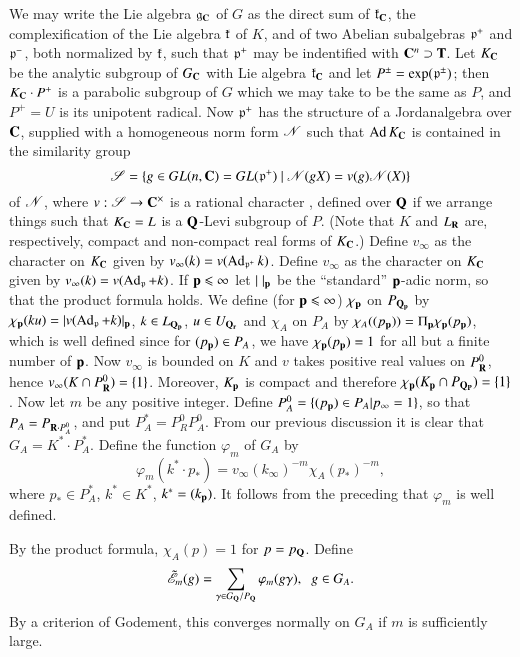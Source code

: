 We may write the Lie algebra $\mathfrak{g}_{\mathbf{C}}$ of $G$ as the direct sum of $\mathfrak{k}_{\mathbf{C}}$, the complexification of the Lie algebra $\mathfrak{k}$ of $K$, and of two Abelian subalgebras $\mathfrak{p}^+$ and $\mathfrak{p}^-$, both normalized by $\mathfrak{k}$, such that $\mathfrak{p}^+$ may be indentified with $\mathbf{C}^n \supset \mathbf{T}$. Let $K_{\mathbf{C}}$ be the analytic subgroup of $G_{\mathbf{C}}$ with Lie algebra $\mathfrak{k}_{\mathbf{C}}$ and let $P^{\pm} = \exp (\mathfrak{p}^{\pm})$; then $K_{\mathbf{C}} \cdot P^+$ is a parabolic subgroup of $G$ which we may take to be the same as $P$, and $P^+ = U$ is its unipotent radical. Now $\mathfrak{p}^+$ has the structure of a Jordan\pageoriginale algebra over $\mathbf{C}$, supplied with a homogeneous norm form $\mathscr{N}$ such that $\operatorname{Ad} K_{\mathbf{C}}$ is contained in the similarity group
$$
\mathscr{S}= \{g \in G L (n, \mathbf{C}) = G L (\mathfrak{p}^+) ~|~ \mathscr{N} (gX) = v (g) \mathscr{N} (X) \}
$$
of $\mathscr{N}$, where $v: \mathscr{S} \to \mathbf{C}^{\times}$ is a rational character \cite{art1-key7}, defined over $\mathbf{Q}$ if we arrange things such that $K_{\mathbf{C}} = L$ is a $\mathbf{Q}$-Levi subgroup of $P$. (Note that $K$ and $L_{\mathbf{R}}$ are, respectively, compact and non-compact real forms of $K_{\mathbf{C}}$.) Define $v_{\infty}$ as the character on $K_{\mathbf{C}}$ given by $v_{\infty} (k) = v (\operatorname{Ad}_{\mathfrak{p}^+} k)$. Define $v_{\infty}$ as the character on $K_{\mathbf{C}}$ given by $v_{\infty}(k)=v(\operatorname{Ad}_{\mathfrak{p}}+k)$. If $\mathbf{p} \leqslant \infty$ let $|{\;}|_{\mathbf{p}}$ be the ``standard'' $\mathbf{p}$-adic norm, so that the product formula holds. We define (for $\mathbf{p} \leqslant \infty$) $\chi_{\mathbf{p}}$ on $P_{\mathbf{Q}_{\mathbf{p}}}$ by $\chi_{\mathbf{p}}(ku)=|v(\operatorname{Ad}_{\mathfrak{p}}+k)|_{\mathbf{p}}$, $k \in L_{\mathbf{Q}_{\mathbf{p}}}$, $u \in U_{\mathbf{Q}_{\mathbf{r}}}$ and $\chi_A$ on $P_A$ by $\chi_A ((p_{\mathbf{p}}))=\Pi_{\mathbf{p}} \chi_{\mathbf{p}} (p_{\mathbf{p}})$, which is well defined since for $(p_{\mathbf{p}}) \in P_A$, we have $\chi_{\mathbf{p}}(p_{\mathbf{p}}) = 1$ for all but a finite number of $\mathbf{p}$. Now $v_{\infty}$ is bounded on $K$ and $v$ takes positive real values on $P^{0}_{\mathbf{R}}$, hence $v_{\infty} (K \cap P^0_{\mathbf{R}})=\{1\}$. Moreover, $K_{\mathbf{p}}$ is compact and therefore $\chi_{\mathbf{p}}(K_{\mathbf{p}} \cap P_{\mathbf{Q}_{\mathbf{P}}}) = \{1\}$. Now let $m$ be any positive integer. Define $P^0_A = \{(p_{\mathbf{p}}) \in P_A | p_{\infty} = 1\}$, so that $P_A = P_{\mathbf{R} \cdot P^0_A}$, and put $P^\ast_A = P^0_R P^0_A$. From our previous discussion it is clear that $G_A = K^{\ast} \cdot P^{\ast}_A$. Define the function $\varphi_{m}$ of $G_A$ by
$$
\varphi_m (k^\ast \cdot p_{\ast}) = v_{\infty}(k_{\infty})^{-m} \chi_A (p_{\ast})^{-m},
$$
where $p_{\ast} \in P^\ast_A$, $k^\ast \in K^\ast$, $k^\ast = (k_{\mathbf{p}})$. It follows from the preceding that $\varphi_{m}$ is well defined.

By the product formula, $\chi_A (p) = 1$ for $p=p_{\mathbf{Q}}$. Define
$$
\tilde{\mathscr{E}}_m (g) = \sum\limits_{\gamma \in G_{\mathbf{Q}}/P_{\mathbf{Q}}} \varphi_m(g\gamma), \;\; g \in G_A.
$$
By a criterion of Godement, this converges normally on $G_A$ if $m$ is sufficiently large.

